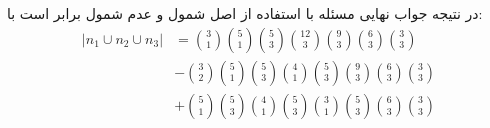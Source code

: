     در نتیجه جواب نهایی مسئله با استفاده از اصل شمول و عدم شمول برابر است با:
    \begin{align*}
     |n_1 \cup n_2 \cup n_3| &= \binom{3}{1}\binom{5}{1}\binom{5}{3}\binom{12}{3}\binom{9}{3}\binom{6}{3}\binom{3}{3}\\
    &- \binom{3}{2}\binom{5}{1}\binom{5}{3}\binom{4}{1}\binom{5}{3}\binom{9}{3}\binom{6}{3}\binom{3}{3}\\
    &+ \binom{5}{1}\binom{5}{3}\binom{4}{1}\binom{5}{3}\binom{3}{1}\binom{5}{3}\binom{6}{3}\binom{3}{3}
    \end{align*}  